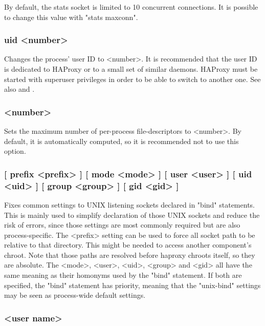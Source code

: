 By default, the stats socket is limited to 10 concurrent connections. It is
possible to change this value with "stats maxconn".

\subsubsection[uid]{uid <number>}

Changes the process' user ID to <number>. It is recommended that the user ID
is dedicated to HAProxy or to a small set of similar daemons. HAProxy must
be started with superuser privileges in order to be able to switch to another
one. See also  and .

\subsubsection[ulimit-n]{ <number>}

Sets the maximum number of per-process file-descriptors to <number>. By
default, it is automatically computed, so it is recommended not to use this
option.

\subsubsection[unix-bind]{ [ prefix <prefix> ] [ mode <mode> ] 
[ user <user> ] [ uid <uid> ] [ group <group> ] [ gid <gid> ]}

Fixes common settings to UNIX listening sockets declared in "bind" statements.
This is mainly used to simplify declaration of those UNIX sockets and reduce
the risk of errors, since those settings are most commonly required but are
also process-specific. The <prefix> setting can be used to force all socket
path to be relative to that directory. This might be needed to access another
component's chroot. Note that those paths are resolved before haproxy chroots
itself, so they are absolute. The <mode>, <user>, <uid>, <group> and <gid>
all have the same meaning as their homonyms used by the "bind" statement. If
both are specified, the "bind" statement has priority, meaning that the
"unix-bind" settings may be seen as process-wide default settings.

\subsubsection[user]{ <user name>}

